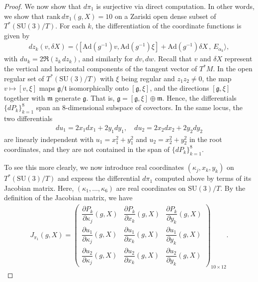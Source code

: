 \documentclass[11pt]{amsart}
\theoremstyle{definition}
\theoremstyle{plain}
\theoremstyle{conclusion}
\begin{document}
\begin{proof}
We now show that $d\pi_1$ is surjective via direct computation. In other words, we show that $\mathrm{rank} \, d \pi_1 (g,X) = 10$ on a Zariski open dense subset of $T^*(\mathrm{SU}(3)/T)$. For each $k$, the differentiation of the coordinate functions is given by
\begin{align}
 dz_k(v,\delta X)= \langle [\mathrm{Ad}(g^{-1})v,\mathrm{Ad}(g^{-1})\xi]+\mathrm{Ad}(g^{-1})\delta X\,,\,E_{\alpha_k}\rangle , \label{eq:diffmp}
\end{align}
with $du_k=2\Re(\bar z_k\,dz_k)$, and similarly for $dv,dw$. Recall that $v$ and $\delta X$ represent the vertical and horizontal components of the tangent vector of $T^*M$. %
In the open regular set of $T^*(\mathrm{SU}(3)/T)$ with $\xi$ being regular and $z_1z_2\neq 0$, the map $v\mapsto [v,\xi]$ maps $\mathfrak{g}/\mathfrak{t}$ isomorphically onto $[\mathfrak{g},\xi]$, and the directions $[\mathfrak{g},\xi]$ together with $\mathfrak{m}$ generate $\mathfrak{g}$. That is, $\mathfrak{g} = [\mathfrak{g},\xi] \oplus \mathfrak{m}$. Hence, the differentials $\{dP_k\}_{k=1}^8$ span an $8$-dimensional subspace of covectors. In the same locus, the two differentials \begin{align}
    du_1 = 2 x_1 dx_1 + 2 y_1 dy_1, \quad du_2 = 2 x_2 dx_2 + 2 y_2 dy_2  \label{eq:uvdif}
\end{align} are linearly independent with $u_1=x_1^2+y_1^2$ and $u_2=x_2^2+y_2^2$ in the root coordinates, and they are not contained in the span of $\{dP_k\}_{k=1}^8$. %

To see this more clearly, we now introduce real coordinates $(\kappa_j,x_k,y_k)$ on $T^*(\mathrm{SU}(3)/T)$ and express the differential $d \pi_1$ computed above by terms of its Jacobian matrix. Here, $(\kappa_1,\ldots,\kappa_6)$ are real coordinates on $\mathrm{SU}(3)/T$. By the definition of the Jacobian matrix, we have \begin{align}
    J_{\pi_1}(g,X)= \begin{pmatrix}
\dfrac{\partial P_k}{\partial \kappa_j}(g,X) & \dfrac{\partial P_k}{\partial x_k}(g,X)&\dfrac{\partial P_k}{\partial y_k}(g,X) \\[6pt]
\dfrac{\partial u_1}{\partial \kappa_j}(g,X) & \dfrac{\partial u_1}{\partial x_k}(g,X)&\dfrac{\partial u_1}{\partial y_k}(g,X) \\[6pt]
\dfrac{\partial u_2}{\partial \kappa_j}(g,X) & \dfrac{\partial u_2}{\partial x_k}(g,X)&\dfrac{\partial u_2}{\partial y_k}(g,X) 
\end{pmatrix}_{10\times12}. \label{eq:Jacobian}
\end{align} 


\end{proof}
\end{document}
